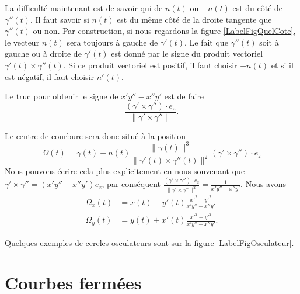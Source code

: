 La difficulté maintenant est de savoir qui de $n(t)$ ou $-n(t)$ est du côté de $\gamma''(t)$. Il faut savoir si $n(t)$ est du même côté de la droite tangente que $\gamma''(t)$ ou non. Par construction, si nous regardons la figure  \ref{LabelFigQuelCote}, le vecteur $n(t)$ sera toujours à gauche de $\gamma'(t)$. Le fait que $\gamma''(t)$ soit à gauche ou à droite de $\gamma'(t)$ est donné par le signe du produit vectoriel $\gamma'(t)\times \gamma''(t)$. Si ce produit vectoriel est positif, il faut choisir $-n(t)$ et si il est négatif, il faut choisir $n'(t)$.

Le truc pour obtenir le signe de $x'y''-x''y'$ est de faire
\begin{equation}
    \frac{ (\gamma'\times\gamma'')\cdot e_z}{\| \gamma'\times\gamma'' \|}.
\end{equation}

Le centre de courbure sera donc situé à la position
\begin{equation}
    \Omega(t)=\gamma(t)-n(t)\frac{ \| \gamma(t) \|^3 }{ \| \gamma'(t)\times\gamma''(t) \|^2 } (\gamma'\times\gamma'')\cdot e_z
\end{equation}
Nous pouvons écrire cela plus explicitement en nous souvenant que $\gamma'\times\gamma''=(x'y''-x''y')e_z$, par conséquent $\frac{ (\gamma'\times\gamma'')\cdot e_z}{\| \gamma'\times\gamma'' \|^2}=\frac{1}{ x'y''-x''y' }$. Nous avons
\begin{subequations}
    \begin{align}
        \Omega_x(t)&=x(t)-y'(t)\frac{ x'^2+y'^2 }{ x'y''-x''y' }\\
        \Omega_y(t)&=y(t)+x'(t)\frac{ x'^2+y'^2 }{ x'y''-x''y' }.
    \end{align}
\end{subequations}

Quelques exemples de cercles osculateurs sont sur la figure \ref{LabelFigOsculateur}.
\newcommand{\CaptionFigOsculateur}{Exemple de cercles osculateurs.}



\section{Courbes fermées}

